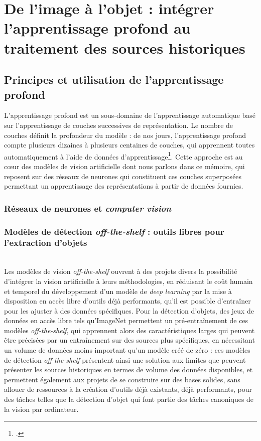 \documentclass[a4paper,12pt,twoside]{book}
\newcommand{\clearemptydoublepage}{\newpage{\pagestyle{empty}\cleardoublepage}}
\begin{document}
    \part{De l’image à l’objet : intégrer l’apprentissage profond au traitement des sources historiques}
        \chapter[L'apprentissage profond]{Principes et utilisation de l’apprentissage profond}
        
        L'apprentissage profond est un sous-domaine de l'apprentissage automatique basé sur l'apprentissage de couches successives de représentation. Le nombre de couches définit la profondeur du modèle : de nos jours, l'apprentissage profond compte plusieurs dizaines à plusieurs centaines de couches, qui apprennent toutes automatiquement à l'aide de données d'apprentissage\footcite{cholletApprentissageProfondAvec2020a}. Cette approche est au cœur des modèles de vision artificielle dont nous parlons dans ce mémoire, qui reposent sur des réseaux de neurones qui constituent ces couches superposées permettant un apprentissage des représentations à partir de données fournies.
        
                \section{Réseaux de neurones et \textit{computer vision}}
                    
            
                \section[Modèles de vision \textit{off-the-shelf}]{Modèles de détection \textit{off-the-shelf} : outils libres pour l'extraction d’objets}
                    
        \\
		
		Les modèles de vision \textit{off-the-shelf} ouvrent à des projets divers la possibilité d'intégrer la vision artificielle à leurs méthodologies, en réduisant le coût humain et temporel du développement d'un modèle de \textit{deep learning} par la mise à disposition en accès libre d'outils déjà performants, qu'il est possible d'entraîner pour les ajuster à des données spécifiques. Pour la détection d'objets, des jeux de données en accès libre tels qu'ImageNet permettent un pré-entraînement de ces modèles \textit{off-the-shelf}, qui apprennent alors des caractéristiques larges qui peuvent être précisées par un entraînement sur des sources plus spécifiques, en nécessitant un volume de données moins important qu'un modèle créé de zéro : ces modèles de détection \textit{off-the-shelf} présentent ainsi une solution aux limites que peuvent présenter les sources historiques en termes de volume des données disponibles, et permettent également aux projets de se construire sur des bases solides, sans allouer de ressources à la création d'outils déjà existants, déjà performants, pour des tâches telles que la détection d'objet qui font partie des tâches canoniques de la vision par ordinateur.
        \clearemptydoublepage
        
\end{document}
